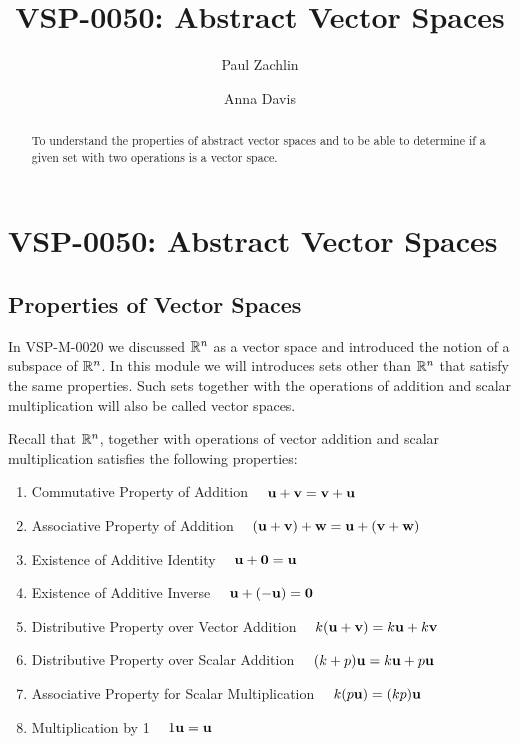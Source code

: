 \documentclass{ximera}
\author{Paul Zachlin \and Anna Davis} \title{VSP-0050: Abstract Vector Spaces} \license{CC-BY 4.0}
\begin{document}
\begin{abstract}
To understand the properties of abstract vector spaces and to be able to determine if a given set with two operations is a vector space.
\end{abstract}
\maketitle


\section*{VSP-0050: Abstract Vector Spaces}
\subsection*{Properties of Vector Spaces} 

In VSP-M-0020 we discussed $\mathbb{R}^n$ as a vector space and introduced the notion of a subspace of $\mathbb{R}^n$.  
In this module we will introduces sets other than $\mathbb{R}^n$ that satisfy the same properties.  Such sets together with the operations of addition and scalar multiplication will also be called vector spaces.

Recall that $\mathbb{R}^n$, together with operations of vector addition and scalar multiplication satisfies the following properties:


  \begin{enumerate}
  \item 
  Commutative Property of Addition  $\quad {\bf u}+{\bf v}={\bf v}+{\bf u}$
  \item 
  Associative Property of Addition $\quad ({\bf u}+{\bf v})+{\bf w}={\bf u}+({\bf v}+{\bf w})$
  \item 
  Existence of Additive Identity  $\quad {\bf u}+{\bf 0}={\bf u}$
  \item 
  Existence of Additive Inverse  $\quad{\bf u}+(-{\bf u})={\bf 0}$
  \item
  Distributive Property over Vector Addition  $\quad k({\bf u}+{\bf v})=k{\bf u}+k{\bf v}$
  \item
  Distributive Property over Scalar Addition  $\quad (k+p){\bf u}=k{\bf u}+p{\bf u}$
  \item 
  Associative Property for Scalar Multiplication $\quad k(p{\bf u})=(kp){\bf u}$
  \item 
  Multiplication by 1 $\quad 1{\bf u}={\bf u}$
  \end{enumerate}
\end{document}
